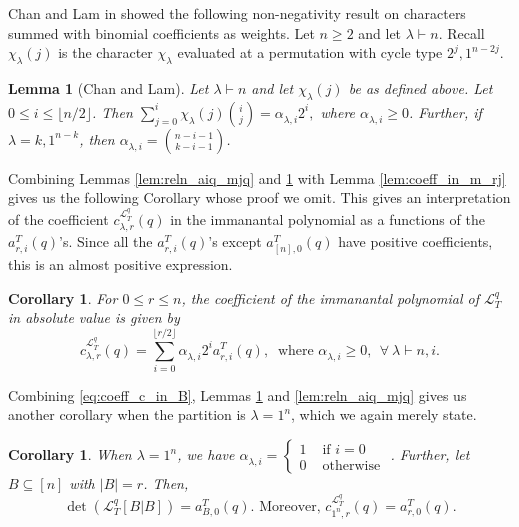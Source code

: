 \documentclass[12pt]{article}
\newtheorem{lemma}[theorem]{Lemma}
\newtheorem{corollary}[theorem]{Corollary}
\newcommand{\sL}{  \mathcal{ L}}
\newcommand{\rhalf}{\lfloor r/2 \rfloor}
\newcommand{\nhalf}{\lfloor n/2 \rfloor}
\begin{document}
Chan and Lam in \cite{chan-lam-binom-coeffs-char} 
showed the following non-negativity result on characters summed 
with binomial coefficients as weights.  
Let $n \geq 2$ and let $\lambda \vdash n$.  
Recall $\chi_{\lambda}^{}(j)$ is the 
character $\chi_{\lambda}^{}$ evaluated at a permutation with cycle type 
$2^j, 1^{n-2j}$.

\begin{lemma}[Chan and Lam]
  \label{lem:character_sum}
Let $\lambda \vdash n$ and let $\chi_{\lambda}^{}(j)$ be as defined above.  
Let $0 \leq i \leq \nhalf$.
Then
$\sum_{j=0}^i \chi_{\lambda}^{}(j) {i \choose j} =  \alpha_{\lambda,i}^{} 2^i,$
where $\alpha_{\lambda,i}^{} \geq 0$.  Further, if 
$\lambda = k,1^{n-k}$, then $\alpha_{\lambda,i}^{ } = \binom{n-i-1 }{k-i-1}$.
\end{lemma}




Combining Lemmas 
\ref{lem:reln_aiq_mjq} 
and 
\ref{lem:character_sum} 
with
Lemma \ref{lem:coeff_in_m_rj}
gives us the following Corollary whose
proof we omit.
This gives an interpretation of the coefficient $c_{\lambda,r}^{\sL_T^q}(q)$ 
in the immanantal polynomial 
as a functions of the $a_{r,i}^T(q)$'s.   Since all the $a_{r,i}^T(q)$'s except
$a_{[n],0}^T(q)$ have positive coefficients, this is an almost positive expression.


\begin{corollary}
\label{cor:coeff_interpret} 
For $0 \leq r \leq n$, the coefficient of the immanantal polynomial of 
$\sL_T^q$  in absolute value is given by
\begin{equation*}
  c_{\lambda,r}^{\sL_T^q}(q) = \sum\limits_{i=0}^{\rhalf} 
  \alpha_{\lambda,i}^{ } 2^i a_{r,i}^T(q),  \
  \mbox{ where } \alpha_{\lambda,i}^{ } \geq 0, \>\> \forall \ \lambda\vdash n, i.
\end{equation*} 
\end{corollary}



Combining \eqref{eq:coeff_c_in_B}, Lemmas \ref{lem:character_sum} and \ref{lem:reln_aiq_mjq} 
gives us another corollary when the 
partition is $\lambda = 1^n$, which we
again merely state.  


\begin{corollary}
\label{cor:smaller_dets} 
When $\lambda = 1^n$, we have 
$\alpha_{\lambda,i}^{} = \begin{cases} 
		1 & \mbox{ if } i = 0\\
		0 & \mbox{ otherwise }
  	\end{cases}
$.  Further, let $B \subseteq [n]$ with $|B| = r$.   Then, 
\begin{equation*}
 \det(\sL_T^q[B|B])  =  a_{B,0}^T(q). \mbox{ Moreover, }  c_{1^n,r}^{\sL_T^q}(q) = a_{r,0}^T(q).
\end{equation*} 
\end{corollary}
\end{document}
